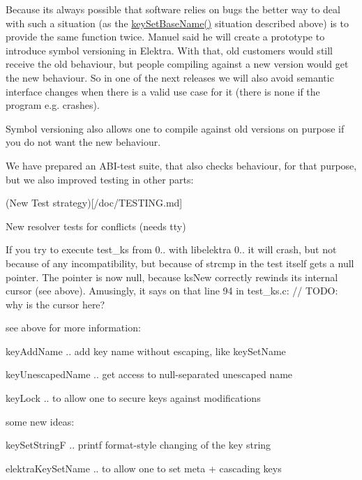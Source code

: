 Because its always possible that software relies on bugs the better way to deal with such a situation (as the \hyperlink{group__keyname_ga6e804bd453f98c28b0ff51430d1df407}{key\+Set\+Base\+Name()} situation described above) is to provide the same function twice. Manuel said he will create a prototype to introduce symbol versioning in Elektra. With that, old customers would still receive the old behaviour, but people compiling against a new version would get the new behaviour. So in one of the next releases we will also avoid semantic interface changes when there is a valid use case for it (there is none if the program e.\+g. crashes).

Symbol versioning also allows one to compile against old versions on purpose if you do not want the new behaviour.

We have prepared an A\+B\+I-\/test suite, that also checks behaviour, for that purpose, but we also improved testing in other parts\+:


\begin{DoxyItemize}
\item (New Test strategy)\mbox{[}/doc/\+T\+E\+S\+T\+I\+NG.md\mbox{]}
\item New resolver tests for conflicts (needs tty)
\end{DoxyItemize}

If you try to execute test\+\_\+ks from 0.. with libelektra 0.. it will crash, but not because of any incompatibility, but because of {\ttfamily strcmp} in the test itself gets a null pointer. The pointer is now null, because ks\+New correctly rewinds its internal cursor (see above). Amusingly, it says on that line 94 in test\+\_\+ks.\+c\+: // T\+O\+DO\+: why is the cursor here?

see above for more information\+:


\begin{DoxyItemize}
\item {\ttfamily key\+Add\+Name} .. add key name without escaping, like key\+Set\+Name
\item {\ttfamily key\+Unescaped\+Name} .. get access to null-\/separated unescaped name
\item {\ttfamily key\+Lock} .. to allow one to secure keys against modifications
\end{DoxyItemize}

some new ideas\+:


\begin{DoxyItemize}
\item {\ttfamily key\+Set\+StringF} .. printf format-\/style changing of the key string
\item {\ttfamily elektra\+Key\+Set\+Name} .. to allow one to set meta + cascading keys
\end{DoxyItemize}

